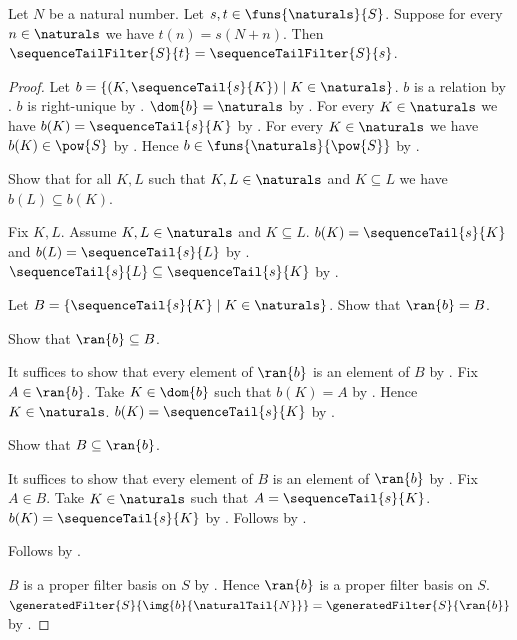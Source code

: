 \begin{theorem}\label{finite_shift_sequence_tail_filter}
    Let $N$ be a natural number.
    Let $s,t\in\funs{\naturals}{S}$.
    Suppose for every $n\in\naturals$ we have $t(n)=s(N+n)$.
    Then $\sequenceTailFilter{S}{t}=\sequenceTailFilter{S}{s}$.
\end{theorem}
\begin{proof}
    Let $b=\{(K,\sequenceTail{s}{K})\mid K\in\naturals\}$.
    $b$ is a relation by .
    $b$ is right-unique by .
    $\dom{b}=\naturals$ by .
    For every $K\in\naturals$ we have
        $b(K)=\sequenceTail{s}{K}$
        by .
    For every $K\in\naturals$ we have $b(K)\in\pow{S}$
        by .
    Hence $b\in\funs{\naturals}{\pow{S}}$ by .

    Show that for all $K,L$ such that $K,L\in\naturals$ and
        $K\subseteq L$ we have $b(L)\subseteq b(K)$.
    \begin{subproof}
        Fix $K,L$.
        Assume $K,L\in\naturals$ and $K\subseteq L$.
        $b(K)=\sequenceTail{s}{K}$ and
            $b(L)=\sequenceTail{s}{L}$
            by .
        $\sequenceTail{s}{L}\subseteq\sequenceTail{s}{K}$
            by .
    \end{subproof}

    Let $B=\{\sequenceTail{s}{K}\mid K\in\naturals\}$.
    Show that $\ran{b}=B$.
    \begin{subproof}
        Show that $\ran{b}\subseteq B$.
        \begin{subproof}
            It suffices to show that every element of $\ran{b}$ is an
                element of $B$ by .
            Fix $A\in\ran{b}$.
            Take $K\in\dom{b}$ such that $b(K)=A$
                by .
            Hence $K\in\naturals$.
            $b(K)=\sequenceTail{s}{K}$
                by .
        \end{subproof}
        Show that $B\subseteq\ran{b}$.
        \begin{subproof}
            It suffices to show that every element of $B$ is an element of
                $\ran{b}$ by .
            Fix $A\in B$.
            Take $K\in\naturals$ such that $A=\sequenceTail{s}{K}$.
            $b(K)=\sequenceTail{s}{K}$
                by .
            Follows by .
        \end{subproof}
        Follows by .
    \end{subproof}
    $B$ is a proper filter basis on $S$
        by .
    Hence $\ran{b}$ is a proper filter basis on $S$.
    $\generatedFilter{S}{\img{b}{\naturalTail{N}}}
        =\generatedFilter{S}{\ran{b}}$
        by .


\end{proof}
